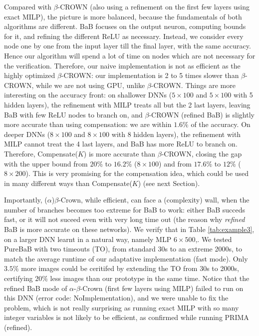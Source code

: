 \documentclass{llncs}
\begin{document}
Compared with $\beta$-CROWN (also using a refinement on the first few layers using exact MILP), 
the picture is more balanced, because the fundamentals of both algorithms are different. BaB 
focuses on the output neuron, computing bounds for it, and refining the different ReLU as necessary. 
Instead, we consider every node one by one from the input layer till the final layer, with the same accuracy. Hence our algorithm will spend a lot of time on nodes which are not necessary for the verification. Therefore, our naive implementation is not as efficient as the highly optimized
$\beta$-CROWN: our implementation is 2 to 5 times slower than $\beta$-CROWN, while we are not using GPU, unlike $\beta$-CROWN. Things are more interesting on the accuracy front: on shallower DNNs ($5 \times 100$ and $5 \times 100$ with 5 hidden layers), the refinement with MILP treats all but the 2 last layers, 
leaving BaB with few ReLU nodes to branch on, and $\beta$-CROWN (refined BaB) is slightly more accurate than using compensation: we are within $1.6\%$ of the accuracy. On deeper DNNs ($8 \times 100$ and $8 \times 100$ with 8 hidden layers), the refinement with MILP cannot treat the 4 last layers, and BaB has more ReLU to branch on. Therefore, Compensate($K$) is more accurate than $\beta$-CROWN, 
closing the gap with the upper bound from $20\%$ to $16.2\%$ ($8 \times 100$)
and from $17.6\%$ to $12\%$ ($8 \times 200$). This is very promising for the compensation idea, which could be used in many different ways than Compensate($K$) (see next Section).
 

\newpage

Importantly, ($\alpha$)$\beta$-Crown, while efficient, can face a (complexity) wall, when the number of branches becomes too extreme for BaB to work: either BaB succeds fast, or it will not suceed even with very long time out (the reason why {\em refined} BaB is more accurate on these networks). We verify that in Table \ref{tab:example3}, on a larger DNN learnt in a natural way, namely MLP $6 \times 500$,.
We tested PureBaB with two timeouts (TO), from standard 30s to an extreme 2000s, to match the average runtime of our adaptative implementation (fast mode). Only $3.5\%$ more images could be ceritifed by extending the TO from 30s to 2000s, certifying $20\%$ less images than our prototype in the same time.
Notice that the refined BaB mode of $\alpha$-$\beta$-Crown (first few layers using MILP) failed to run on this DNN (error code: NoImplementation), and we were unable to fix the problem, which is not really surprising as running exact MILP with so many integer variables is not likely to be efficient, as confirmed while running PRIMA (refined).
\end{document}
